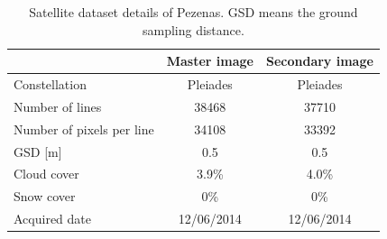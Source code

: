 \begin{table}[htbp]
	\scriptsize %
	\centering
	\begin{tabular}{||l|c|c||}\hline
		& Master image & Secondary image\\\hline
		Constellation & Pleiades & Pleiades \\
		Number of lines & 38468 & 37710 \\
		Number of pixels per line & 34108 & 33392 \\
		GSD [m] & 0.5 & 0.5\\
		Cloud cover & 3.9\% & 4.0\% \\
		Snow cover & 0\% & 0\% \\
		Acquired date & 12/06/2014 & 12/06/2014 \\\hline
	\end{tabular}
	\caption{Satellite dataset details of Pezenas. GSD means the ground sampling distance.}
	\label{SatelliteData}
\end{table}

